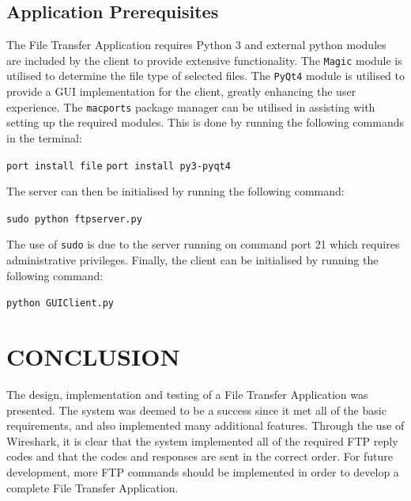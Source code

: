 \documentclass[10pt,twocolumn]{witseiepaper}
\begin{document}
\subsection{Application Prerequisites}
The File Transfer Application requires Python 3 and external python modules are included by the client to provide extensive functionality. The \texttt{Magic} module is utilised  to determine the file type of selected files. The \texttt{PyQt4} module is utilised to provide a GUI implementation for the client, greatly enhancing the user experience. The \texttt{macports} package manager can be utilised in assisting with setting up the required modules. This is done by running the following commands in the terminal:

\texttt{port install file}
\texttt{port install py3-pyqt4}

The server can then be initialised by running the following command:

\texttt{sudo python ftpserver.py}

The use of \texttt{sudo} is due to the server running on command port 21 which requires administrative privileges. Finally, the client can be initialised by running the following command:

\texttt{python GUIClient.py}

\section{CONCLUSION} \label{sec:conclusion}
The design, implementation and testing of a File Transfer Application was presented. The system was deemed to be a success since it met all of the basic requirements, and also implemented many additional features. Through the use of Wireshark, it is clear that the system implemented all of the required FTP reply codes and that the codes and responses are sent in the correct order. For future development, more FTP commands should be implemented in order to develop a complete File Transfer Application.

%
\balance



\end{document}

